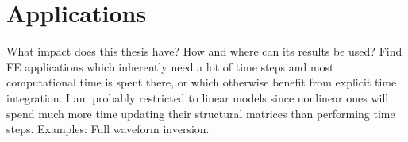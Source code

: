%
\section{Applications}
\label{section:applications}
%
What impact does this thesis have? How and where can its results be used?
Find FE applications which inherently need a lot of time steps and most computational time is spent there, or which otherwise benefit from explicit time integration. I am probably restricted to linear models since nonlinear ones will spend much more time updating their structural matrices than performing time steps.
Examples:
Full waveform inversion.
